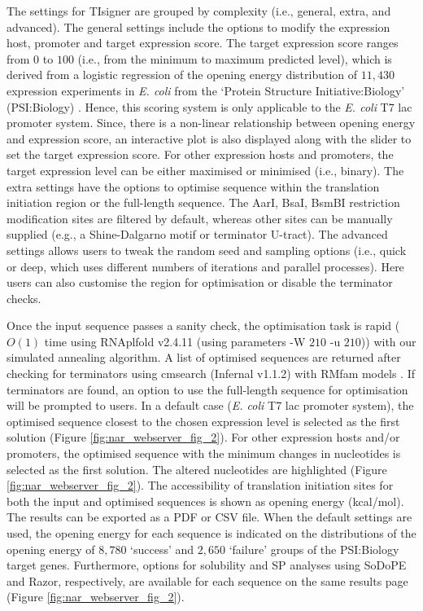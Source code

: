 The settings for TIsigner are grouped by complexity (i.e., general,
extra, and advanced). The general settings include the options to modify
the expression host, promoter and target expression score. The target
expression score ranges from $0$ to $100$ (i.e., from the minimum to 
maximum predicted level), which is derived from a logistic regression of 
the opening energy distribution of $11,430$ expression experiments in 
\emph{E. coli} from the `Protein Structure Initiative:Biology' (PSI:Biology) 
\cite{Chen2004-cp,Seiler2014-on}. Hence, this scoring system is only 
applicable to the \emph{E. coli} T7 lac promoter system. Since, there is a non-linear relationship between opening energy and expression score, an interactive plot is also displayed along with the slider to set the target expression score. For other expression 
hosts and promoters, the target expression level can be either maximised or 
minimised (i.e., binary). The extra settings have the options to optimise 
sequence within the translation initiation region or the full-length sequence. 
The AarI, BsaI, BsmBI restriction modification sites are filtered by default, 
whereas other sites can be manually supplied (e.g., a Shine-Dalgarno motif or terminator U-tract). 
The advanced settings allows users to tweak the random seed and sampling 
options (i.e., quick or deep, which uses different numbers of iterations and 
parallel processes). Here users can also customise the region for optimisation 
or disable the terminator checks.

Once the input sequence passes a sanity check, the optimisation task is
rapid ($O(1)$ time using RNAplfold v2.4.11 (using parameters -W
$210$ -u $210$)) with our simulated annealing algorithm. A list of optimised
sequences are returned after checking for terminators using cmsearch
(Infernal v1.1.2)
\cite{Nawrocki2013-te} with RMfam models
\cite{Gardner2015-ui,Kalvari2021-ck}. If
terminators are found, an option to use the full-length sequence for
optimisation will be prompted to users. In a default case (\emph{E.
coli} T7 lac promoter system), the optimised sequence closest to the
chosen expression level is selected as the first solution (Figure \ref{fig:nar_webserver_fig_2}). For other
expression hosts and/or promoters, the optimised sequence with the
minimum changes in nucleotides is selected as the first solution. The
altered nucleotides are highlighted (Figure \ref{fig:nar_webserver_fig_2}). The accessibility of translation
initiation sites for both the input and optimised sequences is shown as
opening energy (kcal/mol). The results can be exported as a PDF or CSV
file. When the default settings are used, the opening energy for each
sequence is indicated on the distributions of the opening energy of
$8,780$ `success' and $2,650$ `failure' groups of the PSI:Biology target
genes. Furthermore, options for solubility and SP analyses using SoDoPE and 
Razor, respectively, are available for each sequence on
the same results page (Figure \ref{fig:nar_webserver_fig_2}).


